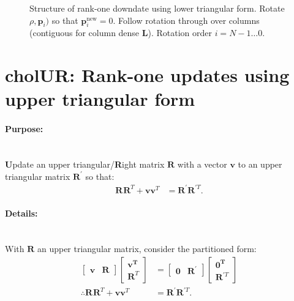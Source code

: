 \documentclass[oneside,english]{scrbook}
\begin{document}
\begin{figure}[h]
  \begin{center}
    \caption{Structure of rank-one downdate using lower triangular
      form. Rotate $\rho,\bm{p}_i)$ so that
      $\bm{p}_i^{\text{new}}=0$. Follow rotation through over columns
      (contiguous for column dense $\bm{L}$). Rotation order $i = N-1
      \ldots 0$.} \label{fig:DDL}
  \end{center}
\end{figure}

\section{cholUR: Rank-one updates using upper triangular form}

\paragraph{Purpose:}~\\
\textbf{U}pdate an upper triangular/\textbf{R}ight matrix
$\bm{R}$ with a vector $\bm{v}$ to an upper triangular matrix
$\bm{R}^{'}$ so that:
\begin{align*}
    \bm{R}^{}\bm{R}^{T}+\bm{v}\bm{v}^T
    &=
    \bm{R}^{'}\bm{R}^{'T}.
\end{align*}

\paragraph{Details:}~\\

With $\bm{R}$ an upper triangular matrix, consider the partitioned form:
\begin{align*}
    \begin{bmatrix}
    \bm{v} & \bm{R}
  \end{bmatrix}
    \begin{bmatrix}
      \bm{v^T} \\
      \bm{R}^{T}
  \end{bmatrix}
  &=
    \begin{bmatrix}
    \bm{0} & \bm{R}^{'}
  \end{bmatrix}
    \begin{bmatrix}
      \bm{0^T} \\
      \bm{R}^{'T}
  \end{bmatrix}\\
    \therefore
    \bm{R}^{}\bm{R}^{T}+\bm{v}\bm{v}^T
    &=
    \bm{R}^{'}\bm{R}^{'T}.
\end{align*}
\end{document}
